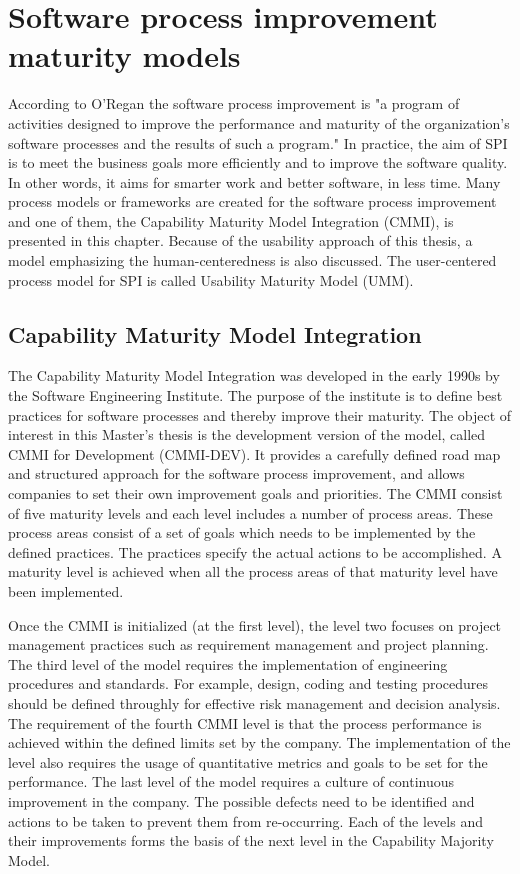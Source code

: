\documentclass[12pt,a4paper,oneside,pdftex]{report}
\begin{document}
\chapter{Software process improvement maturity models}
\label{chapter:maturitymodels}

According to O'Regan \citep{RefWorks:29} the software process improvement is "a program of activities designed to improve the performance and maturity of the organization's software processes and the results of such a program." In practice, the aim of SPI is to meet the business goals more efficiently and to improve the software quality. In other words, it aims for smarter work and better software, in less time. Many process models or frameworks are created for the software process improvement and one of them, the Capability Maturity Model Integration (CMMI), is presented in this chapter. Because of the usability approach of this thesis, a model emphasizing the human-centeredness is also discussed. The user-centered process model for SPI is called Usability Maturity Model (UMM). \citep{RefWorks:29}

\section{Capability Maturity Model Integration}
The Capability Maturity Model Integration was developed in the early 1990s by the Software Engineering Institute. The purpose of the institute is to define best practices for software processes and thereby improve their maturity. The object of interest in this Master's thesis is the development version of the model, called CMMI for Development (CMMI-DEV). It provides a carefully defined road map and  structured approach for the software process improvement, and allows companies to set their own improvement goals and priorities. The CMMI consist of five maturity levels and each level includes a number of process areas. These process areas consist of a set of goals which needs to be implemented by the defined practices. The practices specify the actual actions to be accomplished. A maturity level is achieved when all the process areas of that maturity level have been implemented. \citep{RefWorks:29}

Once the CMMI is initialized (at the first level), the level two focuses on project management practices such as requirement management and project planning. The third level of the model requires the implementation of engineering procedures and standards. For example, design, coding and testing procedures should be defined throughly for effective risk management and decision analysis. The requirement of the fourth CMMI level is that the process performance is achieved within the defined limits set by the company. The implementation of the level also requires the usage of quantitative metrics and goals to be set for the performance. The last level of the model requires a culture of continuous improvement in the company. The possible defects need to be identified and actions to be taken to prevent them from re-occurring. Each of the levels and their improvements forms the basis of the next level in the Capability Majority Model. \citep{RefWorks:29}
\end{document}
